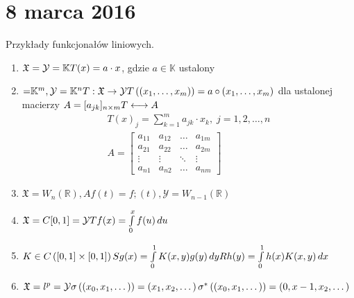 \chapter{8 marca 2016}
\begin{prz}
Przykłady funkcjonałów liniowych.
\begin{enumerate}
\item $ \mathfrak X = \mathcal Y=\mathbb K \\
T(x)=a\cdot x$, gdzie $ a\in\mathbb K $ ustalony
\item $ \mathfrak =\mathbb K^m,\mathcal Y=\mathbb K^n\\
T:\mathfrak X \to \mathcal Y\\
T\left(\left(x_1,\dots,x_m\right)\right)=a\circ\left(x_1,\dots,x_m\right) $ dla ustalonej macierzy  $A=[a_{jk}]_{n\times m} \\
T\longleftrightarrow A $\\
\begin{gather*}
T(x)_j=\sum_{k=1}^{m}a_{jk}\cdot x_k,\;j=1,2,\dots,n\\
A=
\begin{bmatrix}
	a_{11} & a_{12} & \ldots & a_{1m} \\
	a_{21} & a_{22} & \ldots & a_{2m} \\
	\vdots  & \vdots  & \ddots & \vdots  \\
	a_{n1} & a_{n2} & \ldots & a_{nm}
\end{bmatrix}
\end{gather*}
\item $ \mathfrak X=W_n(\mathbb R ),Af(t)=f;(t),\mathcal Y=W_{n-1}(\mathbb R ) $
\item $ \mathfrak X=C[0,1]=\mathcal Y\\
Tf(x)=\int\limits_{0}^{x}f(u)\,du $
\item $ K\in C\left([0,1]\times[0,1]\right) \\
Sg(x)=\int\limits_{0}^{1}K(x,y)g(y)\,dy\\
Rh(y)=\int\limits_{0}^{1}h(x)K(x,y)\,dx$
\item $ \mathfrak X=l^p=\mathcal Y\\
\sigma \left(\left(x_0,x_1,\dots \right)\right) =\left(x_1,x_2,\dots\right)\\
\sigma^*\left(\left(x_0,x_1,\dots \right)\right)=\left(0,x-1,x_2,\dots \right)$
\end{enumerate}
\end{prz}

